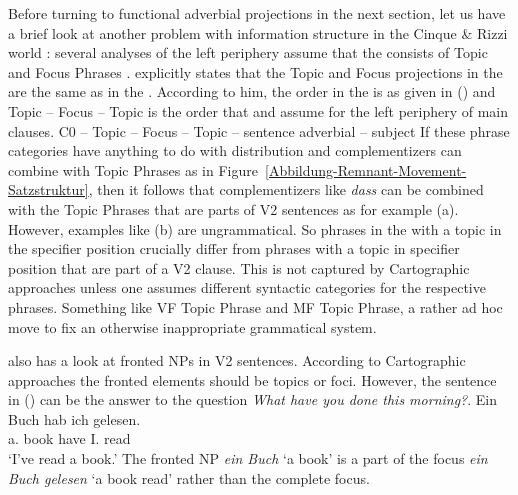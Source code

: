 Before turning to functional adverbial projections in the next section, let us have a brief look at
another problem with information structure in the Cinque \& Rizzi world \citep[]{Rizzi97a-u}: several analyses of the left
periphery assume that the \vf consists of Topic and Focus Phrases \parencites[,
240]{Grewendorf2002a}[, 93]{Grewendorf2005a-u}{Grewendorf2009a}. \citet[]{Grewendorf2005a-u} explicitly states that the Topic and Focus projections in the \mf are the same
as in the \vf. According to him, the order in the \mf is as given in () and Topic – Focus –
Topic is the order that \citet[]{Rizzi97a-u} and \citet[]{Grewendorf2002a} assume for the left periphery of
main clauses. 
\ea
C0 – Topic – Focus – Topic – sentence adverbial – subject
\z
If these phrase categories have anything to do with distribution and complementizers can combine with
Topic Phrases as in Figure~\ref{Abbildung-Remnant-Movement-Satzstruktur}, then it follows that
complementizers like \emph{dass} can be combined with the Topic Phrases that are parts of V2 sentences as for
example (a). However, examples like (b) are ungrammatical.
\eal
{}
\zl
So phrases in the \mf with a topic in the specifier position crucially differ from phrases with a
topic in specifier position that are part of a V2 clause. This is not captured by Cartographic approaches unless one assumes
different syntactic categories for the respective phrases. Something like VF Topic Phrase and MF
Topic Phrase, a rather ad hoc move to fix an otherwise inappropriate grammatical system. 

\largerpage
\citet{Fanselow2006a} also has a look at fronted NPs in V2 sentences. According to Cartographic
approaches the fronted elements should be topics or foci. However, the sentence in () can be
the answer to the question \emph{What have you done this morning?}.
\ea
\gll Ein Buch hab  ich gelesen.\\
     a.\ACC{}   book have I.\NOM{}   read\\\german
\glt `I've read a book.'
\z
The fronted NP \emph{ein Buch} `a book' is a part of the focus \emph{ein Buch gelesen} `a book read'
rather than the complete focus. 

